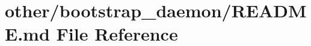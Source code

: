 \hypertarget{other_2bootstrap__daemon_2_r_e_a_d_m_e_8md}{\section{other/bootstrap\+\_\+daemon/\+R\+E\+A\+D\+M\+E.md File Reference}
\label{other_2bootstrap__daemon_2_r_e_a_d_m_e_8md}
}
